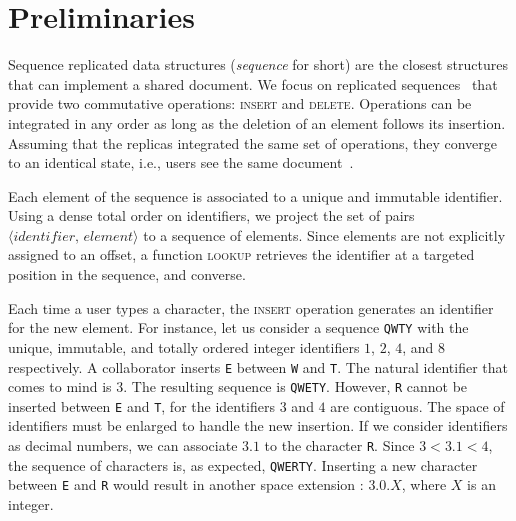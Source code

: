 
\section{Preliminaries}
\label{sec:preliminaries}

Sequence replicated data structures (\emph{sequence} for short) are the closest
structures that can implement a shared document.  We focus on replicated
sequences~\cite{shapiro2011comprehensive, shapiro2011conflict} that provide two
commutative operations: \textsc{insert} and \textsc{delete}. Operations can be
integrated in any order as long as the deletion of an element follows its
insertion. Assuming that the replicas integrated the same set of operations,
they converge to an identical state, i.e., users see the same
document~\cite{shapiro2011conflict}.

\noindent Each element of the sequence is associated to a unique and immutable
identifier. Using a dense total order on identifiers, we project the set of
pairs $\langle identifier,\, element \rangle$ to a sequence of elements. Since
elements are not explicitly assigned to an offset, a function \textsc{lookup}
retrieves the identifier at a targeted position in the sequence, and converse.

Each time a user types a character, the \textsc{insert} operation generates an
identifier for the new element.  For instance, let us consider a sequence
\texttt{QWTY} with the unique, immutable, and totally ordered integer
identifiers $1$, $2$, $4$, and $8$ respectively. A collaborator inserts
\texttt{E} between \texttt{W} and \texttt{T}. The natural identifier that comes
to mind is $3$. The resulting sequence is \texttt{QWETY}. However, \texttt{R}
cannot be inserted between \texttt{E} and \texttt{T}, for the identifiers $3$
and $4$ are contiguous. The space of identifiers must be enlarged to handle the
new insertion. If we consider identifiers as decimal numbers, we can associate
$3.1$ to the character \texttt{R}. Since $3 < 3.1 < 4$, the sequence of
characters is, as expected, \texttt{QWERTY}. Inserting a new character between
\texttt{E} and \texttt{R} would result in another space extension : $3.0.X$,
where $X$ is an integer.


